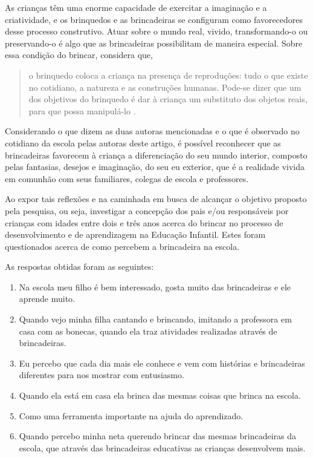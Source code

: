 \begin{refsection}
    As crianças têm uma enorme capacidade de exercitar a imaginação e a criatividade, e os brinquedos e as brincadeiras se configuram como favorecedores desse processo construtivo. Atuar sobre o mundo real, vivido, transformando-o ou preservando-o é algo que as brincadeiras possibilitam de maneira especial. Sobre essa condição do brincar, \textcite{KISHIMOTO1999Jogo} considera que,  

    \begin{quotation}
        o brinquedo coloca a criança na presença de reproduções: tudo o que existe no cotidiano, a natureza e as construções humanas. Pode-se dizer que um dos objetivos do brinquedo é dar à criança um substituto dos objetos reais, para que possa manipulá-lo \cite[p.~18]{KISHIMOTO1999Jogo}. 
    \end{quotation}

    Considerando o que dizem as duas autoras mencionadas e o que é observado no cotidiano da escola pelas autoras deste artigo, é possível reconhecer que as brincadeiras favorecem à criança a diferenciação do seu mundo interior, composto pelas fantasias, desejos e imaginação, do seu eu exterior, que é a realidade vivida em comunhão com seus familiares, colegas de escola e professores. 

    Ao expor tais reflexões e na caminhada em busca de alcançar o objetivo proposto pela pesquisa, ou seja, investigar a concepção dos pais e/ou responsáveis por crianças com idades entre dois e três anos acerca do brincar no processo de desenvolvimento e de aprendizagem na Educação Infantil. Estes foram questionados acerca de como percebem a brincadeira na escola.  

    As respostas obtidas foram as seguintes:

    \begin{enumerate}
        \item Na escola meu filho é bem interessado, gosta muito das brincadeiras e ele aprende muito. 
        \item Quando vejo minha filha cantando e brincando, imitando a professora em casa com as bonecas, quando ela traz atividades realizadas através de brincadeiras. 
        \item Eu percebo que cada dia mais ele conhece e vem com histórias e brincadeiras diferentes para nos mostrar com entusiasmo. 
        \item Quando ela está em casa ela brinca das mesmas coisas que brinca na escola. 
        \item Como uma ferramenta importante na ajuda do aprendizado. 
        \item Quando percebo minha neta querendo brincar das mesmas brincadeiras da escola, que através das brincadeiras educativas as crianças desenvolvem mais. 
    \end{enumerate}


\end{refsection}
